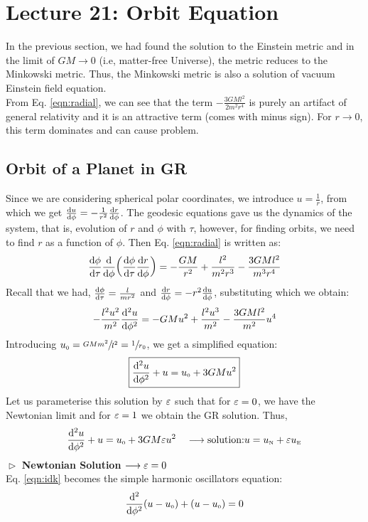 \section*{Lecture 21: Orbit Equation}
In the previous section, we had found the solution to the Einstein metric and in the limit of $GM\to 0$ (i.e, matter-free Universe), the metric reduces to the Minkowski metric. Thus, the Minkowski metric is also a solution of vacuum Einstein field equation.\\[0.2cm] From Eq. \ref{eqn:radial}, we can see that the term $- \frac{3GMl^2}{2m^2r^4}$ is purely an artifact of general relativity and it is an attractive term (comes with minus sign). For $r\to 0$, this term dominates and can cause problem. 
\subsection{Orbit of a Planet in GR}
Since we are considering spherical polar coordinates, we introduce $u = \frac{1}{r}$, from which we get $\dv{u}{\phi} = -\frac{1}{r^2}\dv{r}{\phi}$. The geodesic equations gave us the dynamics of the system, that is, evolution of $r$ and $\phi$ with $\tau$, however, for finding orbits, we need to find $r$ as a function of $\phi$. Then Eq. \ref{eqn:radial} is written as:
\begin{align*}
    \dv{\phi}{\tau} \dv{\phi} \qty( \dv{\phi}{\tau} \dv{r}{\phi}) = -\frac{GM}{r^2} + \frac{l^2}{m^2r^3} - \frac{3GMl^2}{m^3r^4}
\end{align*} 
Recall that we had, $\dv{\phi}{\tau} = \frac{l}{mr^2}$ and $\dv{r}{\phi} = -r^2 \dv{u}{\phi}$, substituting which we obtain:
$$-\frac{l^2u^2}{m^2}\dv[2]{u}{\phi} = -GMu^2 + \frac{l^2 u^3}{m^2} - \frac{3GMl^2}{m^2}u^4$$
Introducing $u_{\text{\tiny 0}} = \sfrac{GMm^2}{l^2} = \sfrac{1}{r_0}$, we get a simplified equation:
$$\boxed{\dv[2]{u}{\phi}+u = u_{\text{\tiny 0}}+3GMu^2}$$
Let us parameterise this solution by $\varepsilon$ such that for $\varepsilon = 0$, we have the Newtonian limit and for $\varepsilon=1$ we obtain the GR solution. Thus, 
\begin{equation}\label{eqn:idk}
    \dv[2]{u}{\phi}+u = u_{\text{\tiny 0}}+3GM\varepsilon u^2 \quad \longrightarrow \text{solution:} u = u_{\text{\tiny N}} + \varepsilon u_{\text{\tiny E}}
\end{equation}
$\vartriangleright$ \textbf{Newtonian Solution} $\longrightarrow \varepsilon =0$\\[0.2cm]
Eq. \ref{eqn:idk} becomes the simple harmonic oscillators equation:
$$\frac{\dd^2}{\dd \phi^2}(u-u_{\text{\tiny 0}}) +(u-u_{\text{\tiny 0}})=0$$
